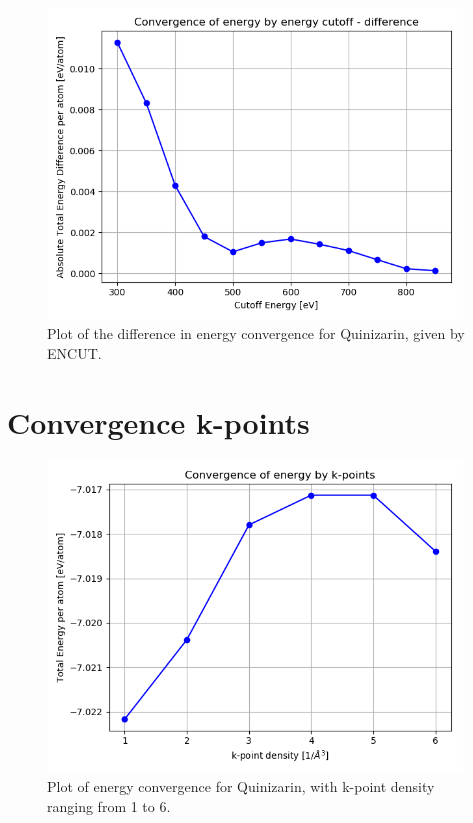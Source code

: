 \documentclass{article}
\begin{document}
  \begin{figure}[H]
      \centering
      \includegraphics[width = 11cm]{../fig/convergence_energy_difference.png}
      \caption{Plot of the difference in energy convergence for Quinizarin, given by ENCUT. }
      \label{fig:convergence_energy_difference.png}
  \end{figure}

\vspace{1cm}

\section{Convergence k-points}

  \begin{figure}[H]
      \centering
      \includegraphics[width = 11cm]{../fig/convergence_kpoints.png}
      \caption{Plot of energy convergence for Quinizarin, with k-point density ranging from 1 to 6. }
      \label{fig:convergence_kpoints.png}
  \end{figure}
\end{document}

